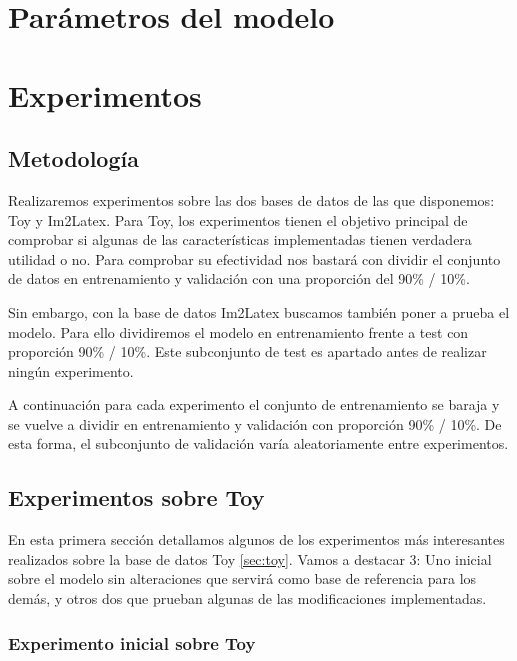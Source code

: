\documentclass[a4paper, 20pt, dvipsnames]{article}
\begin{document}

\section{Parámetros del modelo}
\label{sec:params}


\section{Experimentos}

\subsection{Metodología}

Realizaremos experimentos sobre las dos bases de datos de las que disponemos: Toy y Im2Latex. Para Toy, los experimentos tienen el objetivo principal de comprobar si algunas de las características implementadas tienen verdadera utilidad o no. Para comprobar su efectividad nos bastará con dividir el conjunto de datos en entrenamiento y validación con una proporción del 90\% / 10\%.

Sin embargo, con la base de datos Im2Latex buscamos también poner a prueba el modelo. Para ello dividiremos el modelo en entrenamiento frente a test con proporción 90\% / 10\%. Este subconjunto de test es apartado antes de realizar ningún experimento.

A continuación para cada experimento el conjunto de entrenamiento se baraja y se vuelve a dividir en entrenamiento y validación con proporción 90\% / 10\%. De esta forma, el subconjunto de validación varía aleatoriamente entre experimentos.

\subsection{Experimentos sobre Toy}

En esta primera sección detallamos algunos de los experimentos más interesantes
realizados sobre la base de datos Toy \ref{sec:toy}. Vamos a destacar 3: Uno
inicial sobre el modelo sin alteraciones que servirá como base de referencia
para los demás, y otros dos que prueban algunas de las modificaciones implementadas. 

\subsubsection{Experimento inicial sobre Toy}
\label{exp:toy1}
\end{document}
